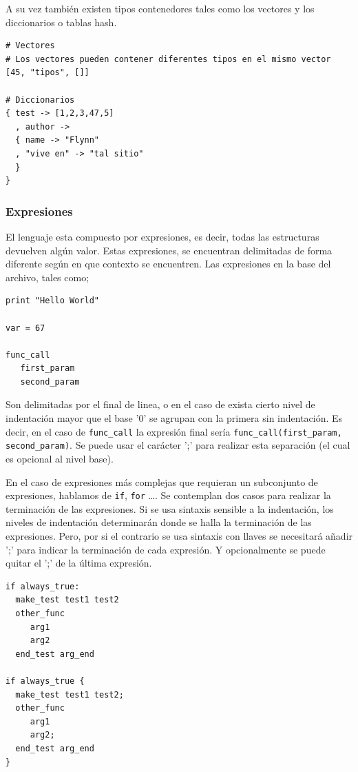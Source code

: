 \documentclass[11pt]{article}
\begin{document}
A su vez también existen tipos contenedores tales como los vectores y los
diccionarios o tablas hash.

\begin{verbatim}
# Vectores
# Los vectores pueden contener diferentes tipos en el mismo vector
[45, "tipos", []]

# Diccionarios
{ test -> [1,2,3,47,5]
  , author ->
  { name -> "Flynn"
  , "vive en" -> "tal sitio"
  }
}

\end{verbatim}

\subsubsection{Expresiones}
\label{sec:orge423363}
El lenguaje esta compuesto por expresiones, es decir, todas las estructuras devuelven algún valor. Estas expresiones, se encuentran delimitadas de forma diferente según en que contexto
se encuentren.
Las expresiones en la base del archivo, tales como;
\begin{verbatim}
print "Hello World"

var = 67

func_call
   first_param
   second_param
\end{verbatim}

Son delimitadas por el final de linea, o en el caso de exista cierto nivel de indentación mayor que el base '0' se agrupan con la primera sin indentación. Es decir, en el caso de \texttt{func\_call}
la expresión final sería \texttt{func\_call(first\_param, second\_param)}. Se puede usar el carácter ';' para realizar esta separación (el cual es opcional al nivel base).

En el caso de expresiones más complejas que requieran un subconjunto de expresiones, hablamos de \texttt{if}, \texttt{for} \ldots{}. Se contemplan dos casos para realizar la terminación de las expresiones.
Si se usa sintaxis sensible a la indentación, los niveles de indentación
determinarán donde se halla la terminación de las expresiones. Pero,
por si el contrario se usa sintaxis con llaves
se necesitará añadir ';' para indicar la terminación de cada expresión. Y opcionalmente se puede quitar el ';' de la última expresión.

\begin{verbatim}
if always_true:
  make_test test1 test2
  other_func
     arg1
     arg2
  end_test arg_end

if always_true {
  make_test test1 test2;
  other_func
     arg1
     arg2;
  end_test arg_end
}
\end{verbatim}
\end{document}
